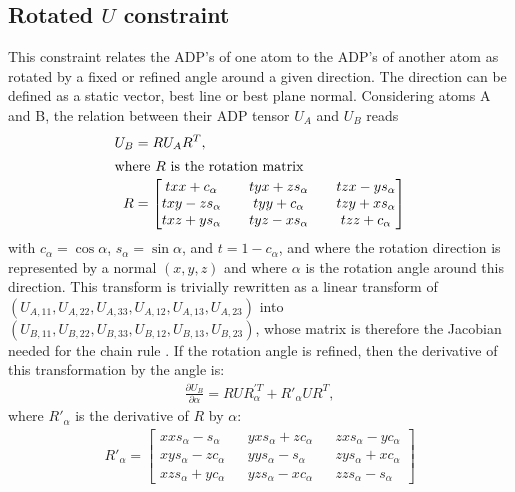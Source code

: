 \documentclass[11pt]{article}
\newcommand{\partialder}[2]{\frac{\partial #1}{\partial #2}}
\begin{document}
\subsection{Rotated $U$ constraint}
This constraint relates the ADP's of one atom to the ADP's of another atom as rotated by a fixed or refined angle around a given direction. The direction can be defined as a static vector, best line or best plane normal. Considering atoms A and B, the relation between their ADP tensor $U_A$ and $U_B$ reads
\begin{align}
U_{B} &= RU_{A}R^{T}, \\
\intertext{where $R$ is the rotation matrix}
R &=
  \begin{bmatrix} 
    txx + c_\alpha && tyx + zs_\alpha && tzx - ys_\alpha \\
    txy - zs_\alpha && tyy + c_\alpha && tzy + xs_\alpha \\
    txz + ys_\alpha && tyz - xs_\alpha && tzz + c_\alpha \\
  \end{bmatrix}
  \label{eqn:rotmat}
\end{align}
with $c_\alpha=\cos\alpha$, $s_\alpha=\sin\alpha$, and $t=1-c_\alpha$, and where the rotation direction is represented by a normal $(x,y,z)$ and where $\alpha$ is the rotation angle around this direction. This transform is trivially rewritten as a linear transform of $(U_{A,11}, U_{A,22}, U_{A,33}, U_{A,12}, U_{A,13}, U_{A,23})$ into $(U_{B,11}, U_{B,22}, U_{B,33}, U_{B,12}, U_{B,13}, U_{B,23})$, whose matrix is therefore the Jacobian needed for the chain rule . If the rotation angle is refined, then the derivative of this transformation by the angle is:
\begin{align}
\partialder{U_{B}}{\alpha} = RUR_\alpha^{\prime T} + R'_\alpha U R^{T},
\end{align}
where $R'_\alpha$ is the derivative of $R$ by $\alpha$:
\begin{align}
R'_\alpha = 
  \begin{bmatrix} 
    xx s_\alpha -  s_\alpha && yx s_\alpha + z c_\alpha && zx s_\alpha - y c_\alpha \\
    xy s_\alpha - z c_\alpha && yy s_\alpha -  s_\alpha && zy s_\alpha + x c_\alpha \\
    xz s_\alpha + y c_\alpha && yz s_\alpha - x c_\alpha && zz s_\alpha - s_\alpha
  \end{bmatrix}
  \label{eqn:rotmatdev}
\end{align}
\end{document}
